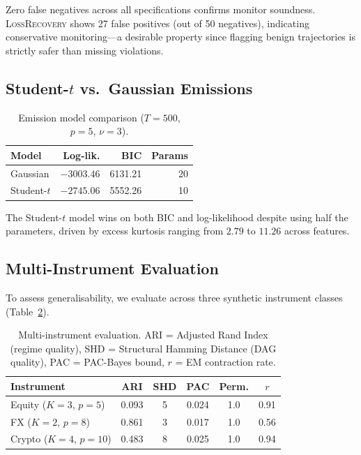 \documentclass[11pt]{article}
\begin{document}
Zero false negatives across all specifications confirms monitor
soundness.  \textsc{LossRecovery} shows 27 false positives (out of 50
negatives), indicating conservative monitoring---a desirable property
since flagging benign trajectories is strictly safer than missing
violations.

\subsection{Student-$t$ vs.\ Gaussian Emissions}

\begin{table}[t]
\centering
\caption{Emission model comparison ($T{=}500$, $p{=}5$,
$\nu{=}3$).}\label{tab:emission}
\small
\begin{tabular}{@{}lrrr@{}}
\toprule
\textbf{Model} & \textbf{Log-lik.} & \textbf{BIC}
  & \textbf{Params} \\
\midrule
Gaussian    & $-3003.46$ & 6131.21 & 20 \\
Student-$t$ & $-2745.06$ & 5552.26 & 10 \\
\bottomrule
\end{tabular}
\end{table}

The Student-$t$ model wins on both BIC and log-likelihood despite
using half the parameters, driven by excess kurtosis ranging from
$2.79$ to $11.26$ across features.

\subsection{Multi-Instrument Evaluation}\label{sec:multi}

To assess generalisability, we evaluate across three synthetic
instrument classes (Table~\ref{tab:multi}).

\begin{table}[t]
\centering
\caption{Multi-instrument evaluation.  ARI = Adjusted Rand Index
(regime quality), SHD = Structural Hamming Distance (DAG quality),
PAC = PAC-Bayes bound, $r$ = EM contraction
rate.}\label{tab:multi}
\small
\begin{tabular}{@{}lccccc@{}}
\toprule
\textbf{Instrument} & \textbf{ARI} & \textbf{SHD}
  & \textbf{PAC} & \textbf{Perm.} & $r$ \\
\midrule
Equity ($K{=}3$, $p{=}5$)
  & 0.093 & 5 & 0.024 & 1.0 & 0.91 \\
FX ($K{=}2$, $p{=}8$)
  & 0.861 & 3 & 0.017 & 1.0 & 0.56 \\
Crypto ($K{=}4$, $p{=}10$)
  & 0.483 & 8 & 0.025 & 1.0 & 0.94 \\
\bottomrule
\end{tabular}
\end{table}
\end{document}
